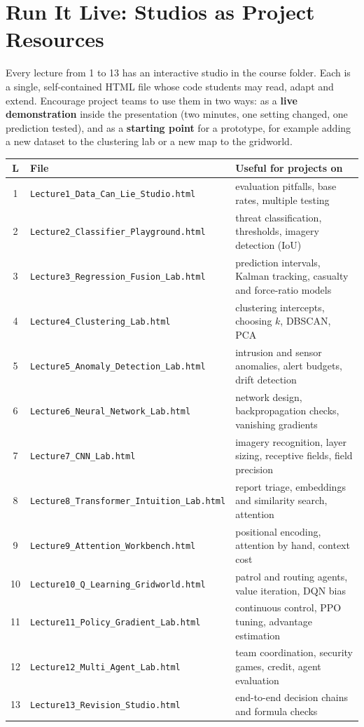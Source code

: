 \documentclass[11pt]{article}
\begin{document}
\section{Run It Live: Studios as Project Resources}\label{sec:live}
Every lecture from 1 to 13 has an interactive studio in the course folder. Each is a single, self-contained HTML file whose code students may read, adapt and extend. Encourage project teams to use them in two ways: as a \textbf{live demonstration} inside the presentation (two minutes, one setting changed, one prediction tested), and as a \textbf{starting point} for a prototype, for example adding a new dataset to the clustering lab or a new map to the gridworld.
\begin{center}\small\renewcommand{\arraystretch}{1.2}\begin{tabularx}{\textwidth}{@{}c l X@{}}\toprule\textbf{L} & \textbf{File} & \textbf{Useful for projects on}\\\midrule
1 & \texttt{Lecture1\_Data\_Can\_Lie\_Studio.html} & evaluation pitfalls, base rates, multiple testing\\
2 & \texttt{Lecture2\_Classifier\_Playground.html} & threat classification, thresholds, imagery detection (IoU)\\
3 & \texttt{Lecture3\_Regression\_Fusion\_Lab.html} & prediction intervals, Kalman tracking, casualty and force-ratio models\\
4 & \texttt{Lecture4\_Clustering\_Lab.html} & clustering intercepts, choosing $k$, DBSCAN, PCA\\
5 & \texttt{Lecture5\_Anomaly\_Detection\_Lab.html} & intrusion and sensor anomalies, alert budgets, drift detection\\
6 & \texttt{Lecture6\_Neural\_Network\_Lab.html} & network design, backpropagation checks, vanishing gradients\\
7 & \texttt{Lecture7\_CNN\_Lab.html} & imagery recognition, layer sizing, receptive fields, field precision\\
8 & \texttt{Lecture8\_Transformer\_Intuition\_Lab.html} & report triage, embeddings and similarity search, attention\\
9 & \texttt{Lecture9\_Attention\_Workbench.html} & positional encoding, attention by hand, context cost\\
10 & \texttt{Lecture10\_Q\_Learning\_Gridworld.html} & patrol and routing agents, value iteration, DQN bias\\
11 & \texttt{Lecture11\_Policy\_Gradient\_Lab.html} & continuous control, PPO tuning, advantage estimation\\
12 & \texttt{Lecture12\_Multi\_Agent\_Lab.html} & team coordination, security games, credit, agent evaluation\\
13 & \texttt{Lecture13\_Revision\_Studio.html} & end-to-end decision chains and formula checks\\\bottomrule\end{tabularx}\end{center}
\end{document}
